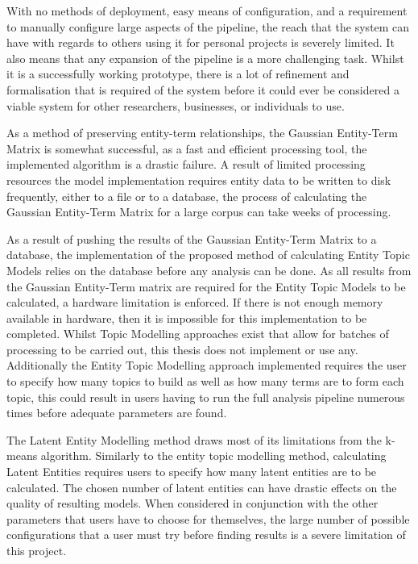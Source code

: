 \documentclass[10pt]{report}
\begin{document}
With no methods of deployment, easy means of configuration, and a requirement to manually configure large aspects of the pipeline, the reach that the system can have with regards to others using it for personal projects is severely limited. It also means that any expansion of the pipeline is a more challenging task. Whilst it is a successfully working prototype, there is a lot of refinement and formalisation that is required of the system before it could ever be considered a viable system for other researchers, businesses, or individuals to use.

As a method of preserving entity-term relationships, the Gaussian Entity-Term Matrix is somewhat successful, as a fast and efficient processing tool, the implemented algorithm is a drastic failure. A result of limited processing resources the model implementation requires entity data to be written to disk frequently, either to a file or to a database, the process of calculating the Gaussian Entity-Term Matrix for a large corpus can take weeks of processing.

As a result of pushing the results of the Gaussian Entity-Term Matrix to a database, the implementation of the proposed method of calculating Entity Topic Models relies on the database before any analysis can be done. As all results from the Gaussian Entity-Term matrix are required for the Entity Topic Models to be calculated, a hardware limitation is enforced. If there is not enough memory available in hardware, then it is impossible for this implementation to be completed. Whilst Topic Modelling approaches exist that allow for batches of processing to be carried out, this thesis does not implement or use any. Additionally the Entity Topic Modelling approach implemented requires the user to specify how many topics to build as well as how many terms are to form each topic, this could result in users having to run the full analysis pipeline numerous times before adequate parameters are found.

The Latent Entity Modelling method draws most of its limitations from the k-means algorithm. Similarly to the entity topic modelling method, calculating Latent Entities requires users to specify how many latent entities are to be calculated. The chosen number of latent entities can have drastic effects on the quality of resulting models. When considered in conjunction with the other parameters that users have to choose for themselves, the large number of possible configurations that a user must try before finding results is a severe limitation of this project.
\end{document}
